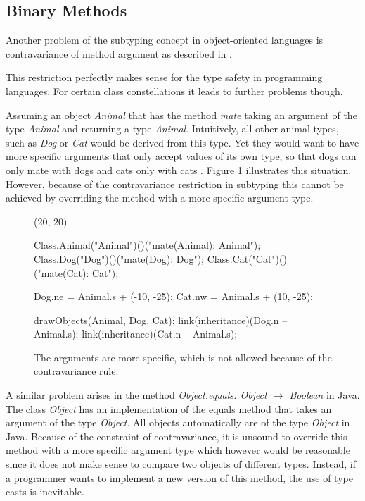 \subsection{Binary Methods}
\label{sec:recursiveClosure}
 Another problem of the subtyping concept in
object-oriented languages is contravariance of method argument as described in 
.

This restriction perfectly makes sense for the type safety in programming
languages. For certain class constellations it leads to further problems
though.

Assuming an object \emph{Animal} that has the method \emph{mate}
taking an argument of the type \emph{Animal} and returning a type
\emph{Animal}. Intuitively, all other animal types, such as \emph{Dog} or
\emph{Cat} would be derived from this type. Yet they would want to have more specific
arguments that only accept values of its own type, so that dogs can only
mate with dogs and cats only with cats \cite{simons_theory_2003-1}. Figure
\ref{fig:animalContravariance} illustrates this situation. However,
because of the contravariance restriction in subtyping this cannot be
achieved by overriding the method with a more specific argument type.

\begin{figure}[H]
	\centering
	\begin{emp}[classdiag](20, 20)

		Class.Animal("Animal")()("mate(Animal): Animal");
		Class.Dog("Dog")()("mate(Dog): Dog");
		Class.Cat("Cat")()("mate(Cat): Cat");

		Dog.ne = Animal.s + (-10, -25);
		Cat.nw = Animal.s + (10, -25);

		drawObjects(Animal, Dog, Cat);
		link(inheritance)(Dog.n -- Animal.s);
		link(inheritance)(Cat.n -- Animal.s);

	\end{emp}
	\caption[More specific arguments.]{The arguments are more specific, which is not allowed because of the contravariance rule.}
	\label{fig:animalContravariance}
\end{figure}

A similar problem arises in the method \emph{Object.equals: Object
$\rightarrow$ Boolean} in Java. The class \emph{Object} has an
implementation of the equals method that takes an argument of the type
\emph{Object}. All objects automatically are of the type \emph{Object}
in Java. Because of the constraint of contravariance, it is unsound
to override this method with a more specific argument type which however would
be reasonable since it does not make sense to compare two objects
of different types. Instead, if a programmer wants to implement a new
version of this method, the use of type casts is inevitable.


